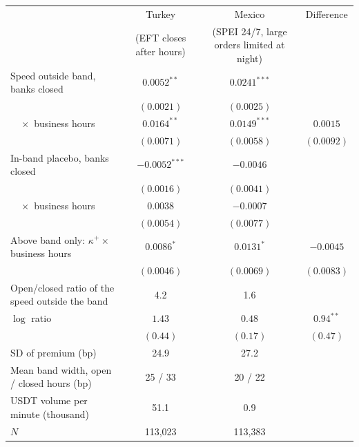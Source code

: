 \begin{tabular}{lccc}
\toprule
 & Turkey & Mexico & Difference \\
 & (EFT closes after hours) & (SPEI 24/7, large orders limited at night) & \\
\midrule
Speed outside band, banks closed & $0.0052^{**}$ & $0.0241^{***}$ &  \\
 & $(0.0021)$ & $(0.0025)$ &  \\
$\quad\times$ business hours & $0.0164^{**}$ & $0.0149^{***}$ & $0.0015$ \\
 & $(0.0071)$ & $(0.0058)$ & $(0.0092)$ \\
In-band placebo, banks closed & $-0.0052^{***}$ & $-0.0046$ &  \\
 & $(0.0016)$ & $(0.0041)$ &  \\
$\quad\times$ business hours & $0.0038$ & $-0.0007$ &  \\
 & $(0.0054)$ & $(0.0077)$ &  \\
\midrule
Above band only: $\kappa^+\times$ business hours & $0.0086^{*}$ & $0.0131^{*}$ & $-0.0045$ \\
 & $(0.0046)$ & $(0.0069)$ & $(0.0083)$ \\
Open/closed ratio of the speed outside the band & 4.2 & 1.6 & \\
$\log$ ratio & $1.43$ & $0.48$ & $0.94^{**}$ \\
 & $(0.44)$ & $(0.17)$ & $(0.47)$ \\
SD of premium (bp) & 24.9 & 27.2 & \\
Mean band width, open / closed hours (bp) & 25 / 33 & 20 / 22 & \\
USDT volume per minute (thousand) & 51.1 & 0.9 & \\
$N$ & 113,023 & 113,383 & \\
\bottomrule
\end{tabular}
